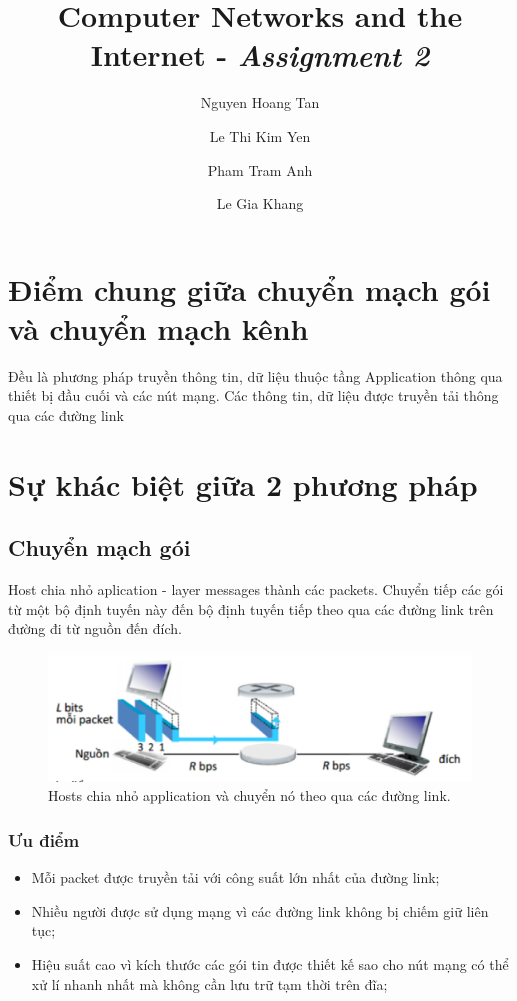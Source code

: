 \documentclass[9pt,twocolumn,twoside,lineno]{gsajnl}
\title{Computer Networks and the Internet - \textit{Assignment 2}}
\author[1,$\dagger$]{Nguyen Hoang Tan}
\author[2]{Le Thi Kim Yen}
\author[3]{Pham Tram Anh}
\author[4]{Le Gia Khang}
\affil[1]{Write report}
\affil[2]{Question 1}
\affil[3]{Question 2}
\affil[4]{Question 3}
\affil[$\dagger$]{These authors contributed equally to this work.}
\begin{document}
\maketitle
\thispagestyle{firststyle}

\vspace{-13pt}



\section{Điểm chung giữa chuyển mạch gói và chuyển mạch kênh}

Đều là phương pháp truyền thông tin, dữ liệu thuộc tầng Application thông qua thiết bị đầu cuối và các nút mạng. Các thông tin, dữ liệu được truyền tải thông qua các đường link

\section{Sự khác biệt giữa 2 phương pháp}
\subsection{Chuyển mạch gói}
Host chia nhỏ aplication - layer messages thành các packets. Chuyển tiếp các gói từ một bộ định tuyến này đến bộ định
tuyến tiếp theo qua các đường link trên đường đi từ nguồn đến đích.


\begin{figure}[h]
  \centering
  \includegraphics[scale=0.3]{q1_1}
  \caption{Hosts chia nhỏ application và chuyển nó theo qua các đường link.}
  \label{fig:my_label}
\end{figure}

\subsubsection{Ưu điểm}
\begin{itemize}
  \item Mỗi packet được truyền tải với công suất lớn nhất của đường link;
  \item Nhiều người được sử dụng mạng vì các đường link không bị chiếm giữ liên tục;
  \item Hiệu suất cao vì kích thước các gói tin được thiết kế sao cho nút mạng có thể xử lí nhanh nhất mà không
  cần lưu trữ tạm thời trên đĩa;
\end{itemize}
\end{document}
